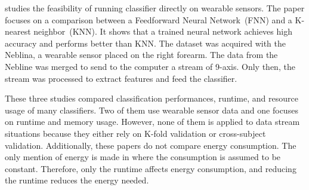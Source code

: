 \cite{omid_2019} studies the feasibility of running classifier directly on
wearable sensors. The paper focuses on a comparison between a Feedforward
Neural Network~(FNN) and a K-nearest neighbor~(KNN). It shows
that a trained neural network achieves high
accuracy and performs better than KNN. The dataset
was acquired with the Neblina, a wearable sensor
placed on the right forearm. The data from the
Nebline was merged to send to the computer a
stream of 9-axis. Only then, the stream was
processed to extract features and feed the
classifier.

These three studies compared classification
performances, runtime, and resource usage of many
classifiers. Two of them use wearable sensor data
and one focuses on runtime and memory usage.
However, none of them is applied to data stream
situations because they either rely on K-fold
validation or cross-subject validation.
Additionally, these papers do not compare energy
consumption. The only mention of energy is made in
\cite{omid_2019} where the consumption is assumed to be
constant. Therefore, only the runtime affects 
energy consumption, and reducing the runtime
reduces the energy needed.


